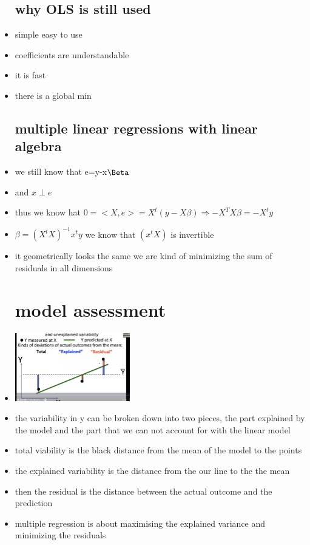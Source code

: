 \documentclass{article}
\begin{document}
\begin{itemize}
\subsection{why OLS is still used}
\item simple easy to use 
\item coefficients are understandable 
\item it is fast
\item there is a global min
\subsection{ multiple linear regressions with linear algebra}
\item we still know that e=y-x$\Beta$
\item and $x\perp e$
\item thus we know hat $0=<X,e>=X^t(y-X\beta)\Rightarrow -X^TX\beta=-X^ty$
\item $\beta= (X^tX)^{-1}x^ty$ we know that $(x^tX)$ is invertible 
\item it geometrically looks the same we are kind of minimizing the sum of residuals in all dimensions 
\section{model assessment }
\item \includegraphics[width= 5cm]{Final_Review/lecture_9/R^2 i guess.jpg}
\item the variability in y can be broken down into two pieces, the part explained by the model and the part that we can not account for with the linear model 
\item total viability is the black distance from the mean of the model to the points 
\item the explained variability is the distance from the our line to the the mean 
\item then the residual is the distance between the actual outcome and the prediction
\item multiple regression is about maximising the explained variance and minimizing the residuals 

\end{itemize}
\end{document}
